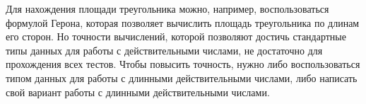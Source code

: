 \solutionSection

Для нахождения площади треугольника можно, например, воспользоваться формулой Герона, которая позволяет вычислить площадь треугольника по длинам его сторон. Но точности вычислений, которой позволяют достичь стандартные типы данных для работы с действительными числами, не достаточно для прохождения всех тестов. Чтобы повысить точность, нужно либо воспользоваться типом данных для работы с длинными действительными числами, либо написать свой вариант работы с длинными действительными числами.

\codeExample

